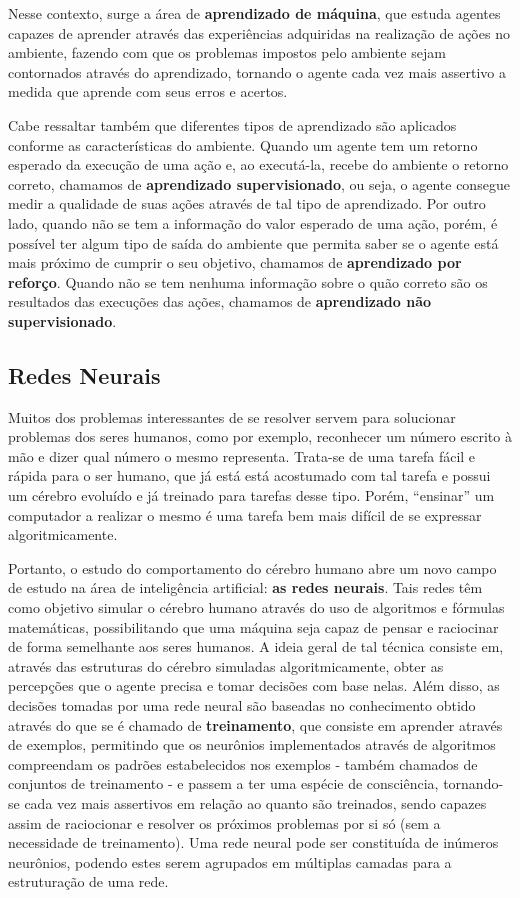Nesse contexto, surge a área de \textbf{aprendizado de máquina}, que estuda
agentes capazes de aprender através das experiências adquiridas na realização de
ações no ambiente, fazendo com que os problemas impostos pelo ambiente sejam
contornados através do aprendizado, tornando o agente cada vez mais assertivo a
medida que aprende com seus erros e acertos.

Cabe ressaltar também que diferentes tipos de aprendizado são aplicados conforme
as características do ambiente. Quando um agente tem um retorno esperado da
execução de uma ação e, ao executá-la, recebe do ambiente o retorno correto,
chamamos de \textbf{aprendizado supervisionado}, ou seja, o agente consegue
medir a qualidade de suas ações através de tal tipo de aprendizado. Por outro
lado, quando não se tem a informação do valor esperado de uma ação, porém, é
possível ter algum tipo de saída do ambiente que permita saber se o agente está
mais próximo de cumprir o seu objetivo, chamamos de \textbf{aprendizado por
reforço}. Quando não se tem nenhuma informação sobre o quão correto são os
resultados das execuções das ações, chamamos de \textbf{aprendizado não
supervisionado}. \cite{Russell:1995:AIM:193191}

\subsection{Redes Neurais}

Muitos dos problemas interessantes de se resolver servem para solucionar
problemas dos seres humanos, como por exemplo, reconhecer um número escrito à
mão e dizer qual número o mesmo representa. Trata-se de uma tarefa fácil e
rápida para o ser humano, que já está está acostumado com tal tarefa e possui
um cérebro evoluído e já treinado para tarefas desse tipo. Porém, ``ensinar'' um
computador a realizar o mesmo é uma tarefa bem mais difícil de se expressar
algoritmicamente.

Portanto, o estudo do comportamento do cérebro humano abre um novo campo de
estudo na área de inteligência artificial: \textbf{as redes neurais}. Tais redes
têm como objetivo simular o cérebro humano através do uso de algoritmos e
fórmulas matemáticas, possibilitando que uma máquina seja capaz de pensar e
raciocinar de forma semelhante aos seres humanos. A ideia geral de tal técnica
consiste em, através das estruturas do cérebro simuladas algoritmicamente,
obter as percepções que o agente precisa e tomar decisões com base nelas. Além
disso, as decisões tomadas por uma rede neural são baseadas no conhecimento
obtido através do que se é chamado de \textbf{treinamento}, que consiste em
aprender através de exemplos, permitindo que os neurônios implementados
através de algoritmos compreendam os padrões estabelecidos nos exemplos -
também chamados de conjuntos de treinamento - e passem a ter uma espécie de
consciência, tornando-se cada vez mais assertivos em relação ao quanto são
treinados, sendo capazes assim de raciocionar e resolver os próximos problemas
por si só (sem a necessidade de treinamento). Uma rede neural pode ser
constituída de inúmeros neurônios, podendo estes serem
agrupados em múltiplas camadas para a estruturação de uma rede.

